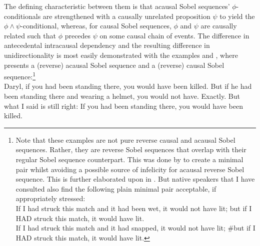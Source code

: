 The defining characteristic between them is that acausal Sobel sequences' $\phi$-conditionals are strengthened with a causally unrelated proposition $\psi$ to yield the $\phi\land\psi$-conditional, whereas, for causal Sobel sequences, $\phi$ and $\psi$ are causally related such that $\phi$ precedes $\psi$ on some causal chain of events. The difference in antecedental intracausal dependency and the resulting difference in unidirectionality is most easily demonstrated with the examples  and , where  presents a (reverse) acausal Sobel sequence and  a (reverse) causal Sobel sequence:\footnote{Note that these examples are not pure reverse causal and acausal Sobel sequences. Rather, they are reverse Sobel sequences that overlap with their regular Sobel sequence counterpart. This was done by \textcite{Klecha2014} to create a minimal pair whilst avoiding a possible source of infelicity for acausal reverse Sobel sequence. This is further elaborated upon in . But native speakers that I have consulted also find the following plain minimal pair acceptable, if appropriately stressed:\vspace{0mm}
\ex{} \\If I had struck this match and it had been wet, it would not have lit; but if I \MakeUppercase{had} struck this match, it would have lit.
\xe%
\ex{} \\If I had struck this match and it had snapped, it would not have lit; \#but if I \MakeUppercase{had} struck this match, it would have lit.
\xe}\\
\pex{}%
			\a	{}Daryl, if you had been standing there, you would have been killed.
			\a	{}But if he had been standing there and wearing a helmet, you would not have.
			\a	{}Exactly. But what I said is still right:  If you had been
standing there, you would have been killed.\hfill\parencite[p. 152f]{Klecha2014}
\xe
\pex{}%
